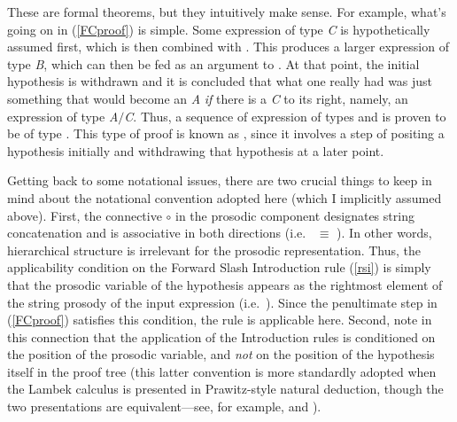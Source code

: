 \documentclass[output=paper
                ,modfonts
                ,nonflat
	        ,collection
	        ,collectionchapter
	        ,collectiontoclongg
 	        ,biblatex
                ,babelshorthands
                ,newtxmath
                ,draftmode
                ,colorlinks, citecolor=brown
]{./langsci/langscibook}
\begin{document}
\noindent
These are formal theorems, but they intuitively make sense.
For example, what's going on in  (\ref{FCproof}) is simple. 
Some expression of type  \textit{C} is 
hypothetically assumed first, which is then combined with
. This produces a larger expression
of type \textit{B}, which can then be fed as an argument to
. 
At that point, the initial hypothesis is withdrawn and it is concluded
that what one really had was just something that would become an \textit{A} \emph{if}
there is a \textit{C} to its right, namely, an expression of type \textit{A}\ensuremath{/}\textit{C}.
Thus, a sequence of expression of types  and 
is proven to be of type .  This type of proof
is known as , since it involves a step of
positing a hypothesis initially and withdrawing that hypothesis
at a later point.

Getting back to some notational issues, there are two crucial things
to keep in mind about the notational 
convention adopted here (which I implicitly assumed above). First, the
connective \ensuremath{\circ}\xspace in the prosodic component designates string
concatenation and is associative in both directions
(i.e.\  \pt{ (\ensuremath{\greekp_1} \ensuremath{\circ}\xspace \ensuremath{\greekp_2}) \ensuremath{\circ}\xspace \ensuremath{\greekp_3}} \ensuremath{ \equiv\xspace } \pt{ \ensuremath{\greekp_1} \ensuremath{\circ}\xspace (\ensuremath{\greekp_2} \ensuremath{\circ}\xspace \ensuremath{\greekp_3}) }). In other words, hierarchical
structure is irrelevant for the prosodic representation. Thus,
the applicability condition on the Forward Slash
Introduction rule (\ref{rsi}) is simply that
the prosodic variable \pt{ \ensuremath{\greekp} }
of the hypothesis appears as the rightmost element of the
string prosody of the input expression (i.e.\
\pt{\ptv{b} \ensuremath{\circ}\xspace \ensuremath{\greekp} }).
Since the penultimate step in (\ref{FCproof}) satisfies this 
condition, the rule is applicable here. Second, note in this
connection that the application of the
Introduction rules is conditioned on the position of the prosodic
variable, and \emph{not} on the position of the hypothesis itself in the
proof tree (this latter convention is more standardly adopted when the
Lambek calculus is presented in Prawitz-style natural deduction,
though the two presentations are
equivalent---see, for example, \citealt{Carpenter98a-u} and \citealt{jaeger05}).
\end{document}
